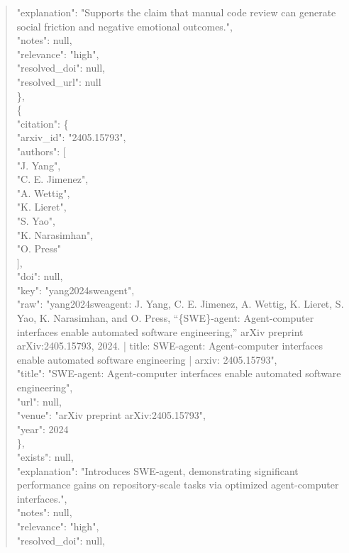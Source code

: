 \documentclass[11pt]{article}
\begin{document}
\begin{quote}
      "explanation": "Supports the claim that manual code review can generate social friction and negative emotional outcomes.",\\
      "notes": null,\\
      "relevance": "high",\\
      "resolved\_doi": null,\\
      "resolved\_url": null\\
    \},\\
    \{\\
      "citation": \{\\
        "arxiv\_id": "2405.15793",\\
        "authors": [\\
          "J. Yang",\\
          "C. E. Jimenez",\\
          "A. Wettig",\\
          "K. Lieret",\\
          "S. Yao",\\
          "K. Narasimhan",\\
          "O. Press"\\
        ],\\
        "doi": null,\\
        "key": "yang2024sweagent",\\
        "raw": "yang2024sweagent: J. Yang, C. E. Jimenez, A. Wettig, K. Lieret, S. Yao, K. Narasimhan, and O. Press, ``\{SWE\}-agent: Agent-computer interfaces enable automated software engineering,'' arXiv preprint arXiv:2405.15793, 2024. | title: SWE-agent: Agent-computer interfaces enable automated software engineering | arxiv: 2405.15793",\\
        "title": "SWE-agent: Agent-computer interfaces enable automated software engineering",\\
        "url": null,\\
        "venue": "arXiv preprint arXiv:2405.15793",\\
        "year": 2024\\
      \},\\
      "exists": null,\\
      "explanation": "Introduces SWE-agent, demonstrating significant performance gains on repository-scale tasks via optimized agent-computer interfaces.",\\
      "notes": null,\\
      "relevance": "high",\\
      "resolved\_doi": null,\\

\end{quote}
\end{document}
